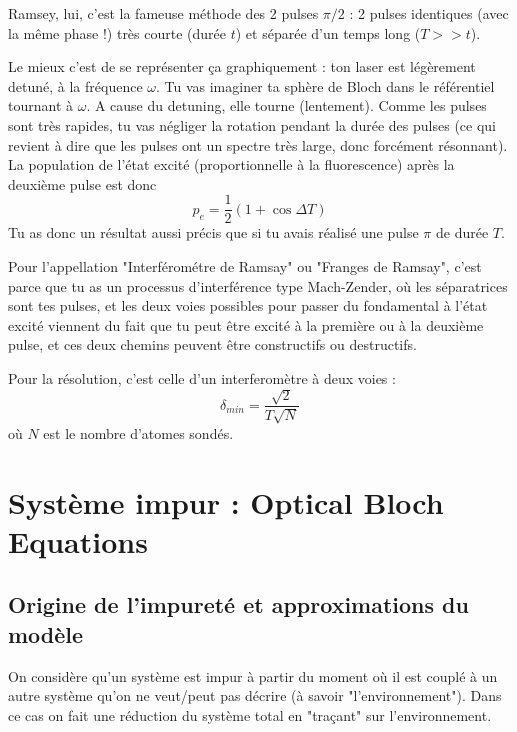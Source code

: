 \documentclass[a4paper]{report}
\begin{document}
   Ramsey, lui, c'est la fameuse méthode des 2 pulses $\pi/2$ : 2 pulses identiques (avec la même phase !) très courte (durée $t$) et séparée d'un temps long ($T >> t$).
   
   Le mieux c'est de se représenter ça graphiquement : ton laser est légèrement detuné, à la fréquence $\omega$. Tu vas imaginer ta sphère de Bloch dans le référentiel tournant à $\omega$. A cause du detuning, elle tourne (lentement). Comme les pulses sont très rapides, tu vas négliger la rotation pendant la durée des pulses (ce qui revient à dire que les pulses ont un spectre très large, donc forcément résonnant). La population de l'état excité (proportionnelle à la fluorescence) après la deuxième pulse est donc \begin{equation}
   p_e=\dfrac{1}{2}(1+\cos\Delta T)
   \end{equation}
   Tu as donc un résultat aussi précis que si tu avais réalisé une pulse $\pi$ de durée $T$.
   
   Pour l'appellation "Interférométre de Ramsay" ou "Franges de Ramsay", c'est parce que tu as un processus d'interférence type Mach-Zender, où les séparatrices sont tes pulses, et les deux voies possibles pour passer du fondamental à l'état excité viennent du fait que tu peut être excité à la première ou à la deuxième pulse, et ces deux chemins peuvent être constructifs ou destructifs.
   
   Pour la résolution, c'est celle d'un interferomètre à deux voies : \begin{equation}
   \delta_{min}=\dfrac{\sqrt{2}}{T\sqrt{N}}
   \end{equation}
   où $N$ est le nombre d'atomes sondés.
   
   \section{Système impur : Optical Bloch Equations}
   
   \subsection{Origine de l'impureté et approximations du modèle}
   On considère qu'un système est impur à partir du moment où il est couplé à un autre système qu'on ne veut/peut pas décrire (à savoir "l'environnement"). Dans ce cas on fait une réduction du système total en "traçant" sur l'environnement.
   
\end{document}
